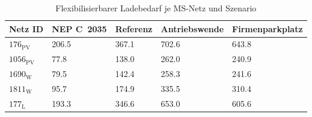 {
\renewcommand{\arraystretch}{1.2}%
\begin{table}[H]
	\begin{center}
		\caption{Flexibilisierbarer Ladebedarf je MS-Netz und Szenario}
		\begin{tabu} to 0.85\textwidth {X[0.6] X[1, r] X[1, r] X[1.2, r] X[1.5, r]}
			\toprule
			Netz ID              & NEP C~\num{2035} & Referenz         & Antriebswende    & \glqq Firmenparkplatz\grqq \\ \midrule
			\(176_{\text{PV}}\)  & \SI{206.5}{\mwh} & \SI{367.1}{\mwh} & \SI{702.6}{\mwh} & \SI{643.8}{\mwh}           \\
			\(1056_{\text{PV}}\) & \SI{77.8}{\mwh}  & \SI{138.0}{\mwh} & \SI{262.0}{\mwh} & \SI{240.9}{\mwh}           \\
			\(1690_{\text{W}}\)  & \SI{79.5}{\mwh}  & \SI{142.4}{\mwh} & \SI{258.3}{\mwh} & \SI{241.6}{\mwh}           \\
			\(1811_{\text{W}}\)  & \SI{95.7}{\mwh}  & \SI{174.9}{\mwh} & \SI{335.5}{\mwh} & \SI{310.4}{\mwh}           \\
			\(177_{\text{L}}\)   & \SI{193.3}{\mwh} & \SI{346.6}{\mwh} & \SI{653.0}{\mwh} & \SI{605.6}{\mwh}           \\ \bottomrule
		\end{tabu}
		\label{tab:flex_demand_per_grid}
	\end{center}
	\vspace{-3mm}%
\end{table}
}